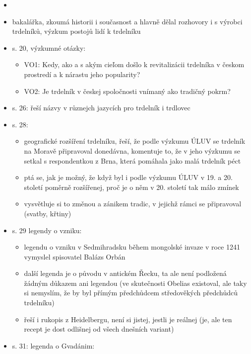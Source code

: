 \begin{itemize}
  \begin{itemize}
  \tightlist
  \item
  \item
    bakalářka, zkoumá historii i současnost a hlavně dělal rozhovory i s
    výrobci trdelníků, výzkum postojů lidí k trdelníku
  \item
    s. 20, výzkumné otázky:

    \begin{itemize}
    \tightlist
    \item
      VO1: Kedy, ako a s akým cieľom došlo k revitalizácii trdelníka v
      českom prostredí a k nárastu jeho popularity?
    \item
      VO2: Je trdelník v českej spoločnosti vnímaný ako tradičný pokrm?
    \end{itemize}
  \item
    s. 26: řeší názvy v různejch jazycích pro trdelník i trdlovec
  \item
    s. 28:

    \begin{itemize}
    \tightlist
    \item
      geografické rozšíření trdelníku, řeší, že podle výzkumu ÚLUV se
      trdelník na Moravě připravoval donedávna, komentuje to, že v jeho
      výzkumu se setkal s respondentkou z Brna, která pomáhala jako malá
      trdelník péct
    \item
      ptá se, jak je možný, že když byl i podle výzkumu ÚLUV v 19. a 20.
      století poměrně rozšířenej, proč je o něm v 20. století tak málo
      zmínek
    \item
      vysvětluje si to změnou a zánikem tradic, v jejichž rámci se
      připravoval (svatby, křtiny)
    \end{itemize}
  \item
    s. 29 legendy o vzniku:

    \begin{itemize}
    \tightlist
    \item
      legendu o vzniku v Sedmihradsku během mongolské invaze v roce 1241
      vymyslel spisovatel Balázs Orbán
    \item
      další legenda je o původu v antickém Řecku, ta ale není podložená
      žádným důkazem ani legendou (ve skutečnosti Obelias existoval, ale
      taky si nemyslím, že by byl přímým předchůdcem středověkých
      předchůdců trdelníku)
    \item
      řeší i rukopis z Heidelbergu, není si jistej, jestli je reálnej
      (je, ale ten recept je dost odlišnej od všech dnešních variant)
    \end{itemize}
  \item
    s. 31: legenda o Gvadánim:


\end{itemize}
\end{itemize}
